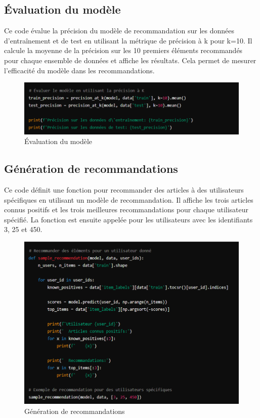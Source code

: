 \documentclass[edit,12pt,a4paper,ChapStyle,oneside,doubleinterligne]{report}
\begin{document}
\subsection{Évaluation du modèle}
Ce code évalue la précision du modèle de recommandation sur les données d'entraînement et de test en utilisant la métrique de précision à k pour k=10. Il calcule la moyenne de la précision sur les 10 premiers éléments recommandés pour chaque ensemble de données et affiche les résultats. Cela permet de mesurer l'efficacité du modèle dans les recommandations.
\begin{figure} [H]
    \centering
    \includegraphics[width=1\textwidth]{images/Évaluation du modèle.png}
    \caption{Évaluation du modèle}
    \label{fig: Évaluation du modèle}
\end{figure}
\subsection{Génération de recommandations}
Ce code définit une fonction pour recommander des articles à des utilisateurs spécifiques en utilisant un modèle de recommandation. Il affiche les trois articles connus positifs et les trois meilleures recommandations pour chaque utilisateur spécifié. La fonction est ensuite appelée pour les utilisateurs avec les identifiants 3, 25 et 450.
\begin{figure} [H]
    \centering
    \includegraphics[width=1\textwidth]{images/Génération de recommandations.png}
    \caption{Génération de recommandations}
    \label{fig:Génération de recommandations}
\end{figure}
\end{document}
